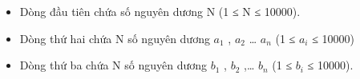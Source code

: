 \begin{itemize}
	\item     Dòng đầu tiên chứa số nguyên dương N (1 ≤ N ≤ 10000).   
	\item     Dòng thứ hai chứa N số nguyên dương $a_{1}$    , $a_{2}$    … $a_{n}$    (1 ≤ $a_{i}$    ≤ 10000)   
	\item     Dòng thứ ba chứa N số nguyên dương $b_{1}$    , $b_{2}$    ,… $b_{n}$    (1 ≤ $b_{i}$    ≤ 10000).   
\end{itemize}